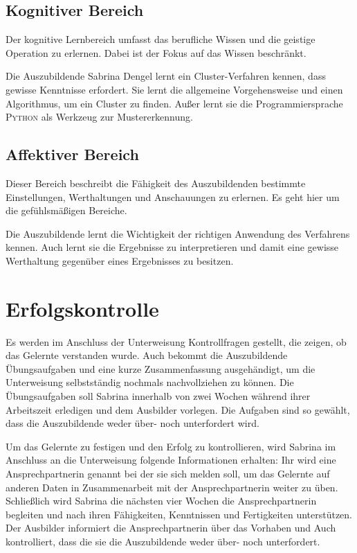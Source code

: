 \subsection{Kognitiver Bereich}
Der kognitive Lernbereich umfasst das berufliche Wissen und die geistige Operation zu erlernen. Dabei ist der Fokus auf das Wissen beschränkt. 
\par
Die Auszubildende Sabrina Dengel lernt ein Cluster-Verfahren kennen, dass gewisse Kenntnisse erfordert. Sie lernt die allgemeine Vorgehensweise und einen Algorithmus, um ein Cluster zu finden. Außer lernt sie die Programmiersprache \textsc{Python} als Werkzeug zur Mustererkennung.

\subsection{Affektiver Bereich}
Dieser Bereich beschreibt die Fähigkeit des Auszubildenden bestimmte Einstellungen, Werthaltungen und Anschauungen zu erlernen. Es geht hier um die gefühlsmäßigen Bereiche.
\par
Die Auszubildende lernt die Wichtigkeit der richtigen Anwendung des Verfahrens kennen. Auch lernt sie die Ergebnisse zu interpretieren und damit eine gewisse Werthaltung gegenüber eines Ergebnisses zu besitzen.


\section{Erfolgskontrolle}\label{kap3:erfolg}
Es werden im Anschluss der Unterweisung Kontrollfragen gestellt, die zeigen, ob das Gelernte verstanden wurde. Auch bekommt die Auszubildende Übungsaufgaben und eine kurze Zusammenfassung ausgehändigt, um die Unterweisung selbstständig nochmals nachvollziehen zu können. Die Übungsaufgaben soll Sabrina innerhalb von zwei Wochen während ihrer Arbeitszeit erledigen und dem Ausbilder vorlegen. Die Aufgaben sind so gewählt, dass die Auszubildende weder über- noch unterfordert wird.
\par
Um das Gelernte zu festigen und den Erfolg zu kontrollieren, wird Sabrina im Anschluss an die Unterweisung folgende Informationen erhalten: Ihr wird eine Ansprechpartnerin genannt bei der sie sich melden soll, um das Gelernte auf anderen Daten in Zusammenarbeit mit der Ansprechpartnerin weiter zu üben. Schließlich wird Sabrina die nächsten vier Wochen die Ansprechpartnerin begleiten und nach ihren Fähigkeiten, Kenntnissen und Fertigkeiten unterstützen. Der Ausbilder informiert die Ansprechpartnerin über das Vorhaben und Auch kontrolliert, dass die sie die Auszubildende weder über- noch unterfordert. 


